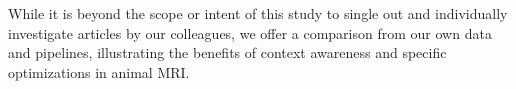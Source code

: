 While it is beyond the scope or intent of this study to single out and individually investigate articles by our colleagues, we offer a comparison from our own data and pipelines, illustrating the benefits of context awareness and specific optimizations in animal MRI.
